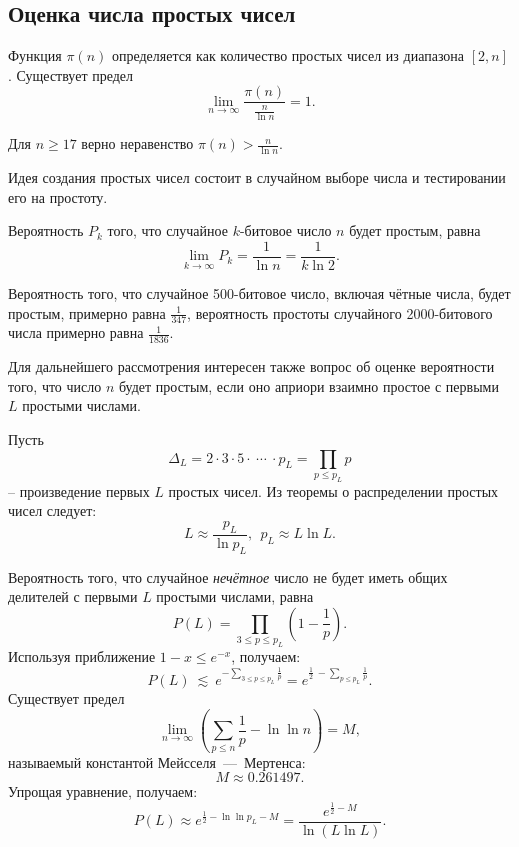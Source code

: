 \subsection{Оценка числа простых чисел}

Функция $\pi(n)$ определяется как количество простых чисел из диапазона $[2, n]$.
Существует предел~\cite{Selberg:1949}
    \[ \lim\limits_{n \rightarrow \infty}\frac{ \pi(n)}{ \frac{n}{\ln n}}=1. \]

Для $n \geq 17$ верно неравенство $\pi(n) > \frac{n}{\ln n}$.

Идея создания простых чисел состоит в случайном выборе числа и тестировании его на простоту.

Вероятность $P_k$ того, что случайное $k$-битовое число $n$ будет простым, равна
    \[ \lim\limits_{k \rightarrow \infty} P_k = \frac{1}{\ln n} = \frac{1}{k \ln 2}. \]

\example
    Вероятность того, что случайное 500-битовое число, включая чётные числа, будет простым, примерно равна $\frac{1}{347}$, вероятность простоты случайного 2000-битового числа примерно равна $\frac{1}{1836}$.
\exampleend

Для дальнейшего рассмотрения интересен также вопрос об оценке вероятности того, что число $n$ будет простым, если оно априори взаимно простое с первыми $L$ простыми числами.

Пусть
    \[ \Delta_L = 2 \cdot 3 \cdot 5 \cdot ~\cdots~ \cdot p_L = \prod \limits_{p \leq p_L} p \] --
произведение первых $L$ простых чисел. Из теоремы о распределении простых чисел следует:
    \[ L \approx \frac{p_L}{\ln p_L}, ~~ p_L \approx L \ln L. \]

Вероятность того, что случайное \emph{нечётное} число не будет иметь общих делителей с первыми $L$ простыми числами, равна
    \[ P(L) = \prod \limits_{3 \leq p \leq p_L} \left( 1 - \frac{1}{p} \right). \]
Используя приближение $1-x \leq e^{-x}$, получаем:
    \[ P(L) ~\lesssim~ e^{-\sum\limits_{3 \leq p \leq p_L} \frac{1}{p}} = e^{\frac{1}{2} ~ - \sum\limits_{p \leq p_L} \frac{1}{p}}. \]
Существует предел
    \[ \lim \limits_{n \rightarrow \infty} \left( \sum \limits_{p \leq n} \frac{1}{p} - \ln \ln n \right) = M, \]
называемый константой Мейсселя~---~Мертенса:
    \[ M \approx 0.261497. \]
Упрощая уравнение, получаем:
    \[ P(L) \approx e^{\frac{1}{2} - \ln \ln p_L - M} = \frac{e^{\frac{1}{2} - M}}{\ln(L \ln L)}. \]

